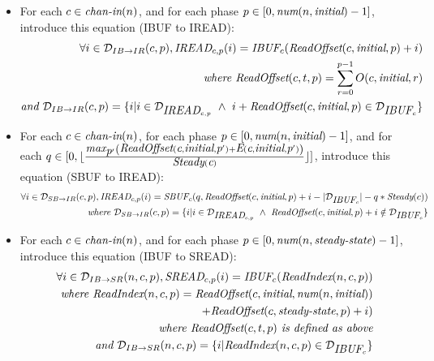 \begin{itemize}
\item For each $c \in \mbox{\it chan-in}(n)$, and for each phase $p \in
[0, \mbox{\it num}(n, \mbox{\it initial})-1]$, introduce this equation (IBUF to IREAD):
\begin{align*}
\forall i \in {\cal D}_{IB \rightarrow IR}(c,p), 
\mbox{\it IREAD}_{c, p}(i) = \mbox{\it IBUF}_{c}(\mbox{\it ReadOffset}(c, \mbox{\it initial}, p) + i) \\
\mbox{\it where ReadOffset}(c,t,p) = \sum_{r=0}^{p-1} O(c, \mbox{\it initial}, r) \\
\mbox{\it and }{\cal D}_{IB \rightarrow IR}(c,p) = 
  \{ i | i \in {\cal D}_{\mbox{\it IREAD}_{c,p}} ~\wedge~ 
         i + \mbox{\it ReadOffset}(c, \mbox{\it initial}, p) \in {\cal D}_{\mbox{\it IBUF}_{c}} \}
\end{align*}

\item For each $c \in \mbox{\it chan-in}(n)$, for each phase $p \in [0,
\mbox{\it num}(n, \mbox{\it initial})-1]$, and for \\ each $q \in [0, \lfloor
\frac{\mbox{\it max}_{\mbox{\it p}'} \left( \mbox{\it ReadOffset}(\mbox{\it c}, \mbox{\it initial},
\mbox{\it p}') + \mbox{\it E}(\mbox{\it c}, \mbox{\it initial}, \mbox{\it p}') \right)
}{\mbox{\it Steady}(\mbox{\it c})} \rfloor ]$, introduce this equation (SBUF to
IREAD):
\begin{align*}
\forall i \in {\cal D}_{SB \rightarrow IR}(c,p), 
\mbox{\it IREAD}_{c,p}(i) = 
    \mbox{\it SBUF}_{c}(q,
      \mbox{\it ReadOffset}(c, \mbox{\it initial}, p) + i - 
            |{\cal D}_{\mbox{\it IBUF}_{c}}| - q * \mbox{\it Steady}(c)) \\
\mbox{\it where }{\cal D}_{SB \rightarrow IR}(c,p) = 
  \{ i | i \in {\cal D}_{\mbox{\it IREAD}_{c,p}} ~\wedge~ 
         \mbox{\it ReadOffset}(c, \mbox{\it initial}, p) + i \notin {\cal D}_{\mbox{\it IBUF}_{c}} \}
\end{align*}

\item For each $c \in \mbox{\it chan-in}(n)$, and for each phase $p \in [0,
\mbox{\it num}(n, \mbox{\it steady-state})-1]$, introduce this equation (IBUF to
SREAD):
\begin{align*}
\forall i \in {\cal D}_{IB \rightarrow SR}(n,c,p), 
\mt{SREAD}_{c, p}(i) = 
    \mt{IBUF}_{c}(\mt{ReadIndex}(n,c,p)) \\
\mt{where ReadIndex}(n,c,p) = \mt{ReadOffset}(c, \mt{initial}, \mt{num}(n, \mt{initial}))
                \\ + \mt{ReadOffset}(c, \mt{steady-state}, p) + i) \\
\mt{where ReadOffset}(c,t,p) \mt{ is defined as above} \\
\mt{and }{\cal D}_{IB \rightarrow SR}(n,c,p) = 
  \{ i | \mt{ReadIndex}(n,c,p) \in {\cal D}_{\mt{IBUF}_{c}} \} \\
\end{align*}


\end{itemize}
